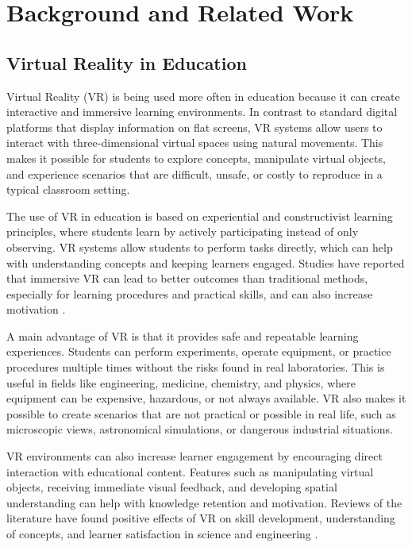 \chapter{Background and Related Work}

\section{Virtual Reality in Education}

Virtual Reality (VR) is being used more often in education because it can create interactive and immersive learning environments. In contrast to standard digital platforms that display information on flat screens, VR systems allow users to interact with three-dimensional virtual spaces using natural movements. This makes it possible for students to explore concepts, manipulate virtual objects, and experience scenarios that are difficult, unsafe, or costly to reproduce in a typical classroom setting.

The use of VR in education is based on experiential and constructivist learning principles, where students learn by actively participating instead of only observing. VR systems allow students to perform tasks directly, which can help with understanding concepts and keeping learners engaged. Studies have reported that immersive VR can lead to better outcomes than traditional methods, especially for learning procedures and practical skills, and can also increase motivation \cite{conrad2024learning}.

A main advantage of VR is that it provides safe and repeatable learning experiences. Students can perform experiments, operate equipment, or practice procedures multiple times without the risks found in real laboratories. This is useful in fields like engineering, medicine, chemistry, and physics, where equipment can be expensive, hazardous, or not always available. VR also makes it possible to create scenarios that are not practical or possible in real life, such as microscopic views, astronomical simulations, or dangerous industrial situations.

VR environments can also increase learner engagement by encouraging direct interaction with educational content. Features such as manipulating virtual objects, receiving immediate visual feedback, and developing spatial understanding can help with knowledge retention and motivation. Reviews of the literature have found positive effects of VR on skill development, understanding of concepts, and learner satisfaction in science and engineering \cite{yang2024impact, tusher2024vrskills}.

